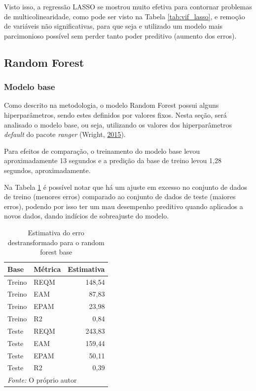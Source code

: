 \documentclass[
	12pt,				%
	a4paper,		%
	oneside,    %
	chapter=TITLE,		   %
	section=TITLE,		   %
	subsection=TITLE,	   %
	subsubsection=TITLE, %
	english,			%
	french,				%
	spanish,			%
	brazil,				%
]{abntex2}
\begin{document}
Visto isso, a regressão LASSO se mostrou muito efetiva para contornar
problemas de multicolinearidade, como pode ser visto na Tabela
\ref{tab:vif_lasso}, e remoção de variáveis não significativas, para que
seja e utilizado um modelo mais parcimonioso possível sem perder tanto
poder preditivo (aumento dos erros).

\hypertarget{random-forest}{%
\subsection{Random Forest}\label{random-forest}}

\hypertarget{modelo-base}{%
\subsubsection{Modelo base}\label{modelo-base}}

Como descrito na metodologia, o modelo Random Forest possui alguns
hiperparâmetros, sendo estes definidos por valores fixos. Nesta seção,
será analisado o modelo base, ou seja, utilizando os valores dos
hiperparâmetros \emph{default} do pacote \emph{ranger} (Wright,
\protect\hyperlink{ref-wright2015ranger}{2015}).

Para efeitos de comparação, o treinamento do modelo base levou
aproximadamente 13 segundos e a predição da base de treino levou 1,28
segundos, aproximadamente.

Na Tabela \ref{tab:rf0_metricas} é possível notar que há um ajuste em
excesso no conjunto de dados de treino (menores erros) comparado ao
conjunto de dados de teste (maiores erros), podendo por isso ter um mau
desempenho preditivo quando aplicados a novos dados, dando indícios de
sobreajuste do modelo.

\begin{table}

\caption{\label{tab:rf0_metricas}Estimativa do erro destransformado para o random forest base}
\centering
\begin{tabular}[t]{l|l|r}
\hline
Base & Métrica & Estimativa\\
\hline
Treino & REQM & 148,54\\
\hline
Treino & EAM & 87,83\\
\hline
Treino & EPAM & 23,98\\
\hline
Treino & R2 & 0,84\\
\hline
Teste & REQM & 243,83\\
\hline
Teste & EAM & 159,44\\
\hline
Teste & EPAM & 50,11\\
\hline
Teste & R2 & 0,39\\
\hline
\multicolumn{3}{l}{\textit{Fonte: } O próprio autor}\\
\end{tabular}
\end{table}
\end{document}
